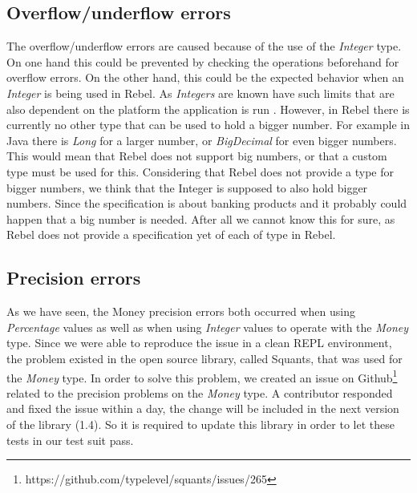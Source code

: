 \subsection*{Overflow/underflow errors}
The overflow/underflow errors are caused because of the use of the \textit{Integer} type. On one hand this could be prevented by checking the operations beforehand for overflow errors. On the other hand, this could be the expected behavior when an \textit{Integer} is being used in Rebel. As \textit{Integers} are known have such limits that are also dependent on the platform the application is run . However, in Rebel there is currently no other type that can be used to hold a bigger number. For example in Java there is \textit{Long} for a larger number, or \textit{BigDecimal} for even bigger numbers. This would mean that Rebel does not support big numbers, or that a custom type must be used for this. Considering that Rebel does not provide a type for bigger numbers, we think that the Integer is supposed to also hold bigger numbers. Since the specification is about banking products and it probably could happen that a big number is needed. After all we cannot know this for sure, as Rebel does not provide a specification yet of each of type in Rebel.

\subsection*{Precision errors}
As we have seen, the Money precision errors both occurred when using \textit{Percentage} values as well as when using \textit{Integer} values to operate with the \textit{Money} type. Since we were able to reproduce the issue in a clean REPL environment, the problem existed in the open source library, called Squants, that was used for the \textit{Money} type. In order to solve this problem, we created an issue on Github\footnote{https://github.com/typelevel/squants/issues/265} related to the precision problems on the \textit{Money} type. A contributor responded and fixed the issue within a day, the change will be included in the next version of the library (1.4). So it is required to update this library in order to let these tests in our test suit pass.




